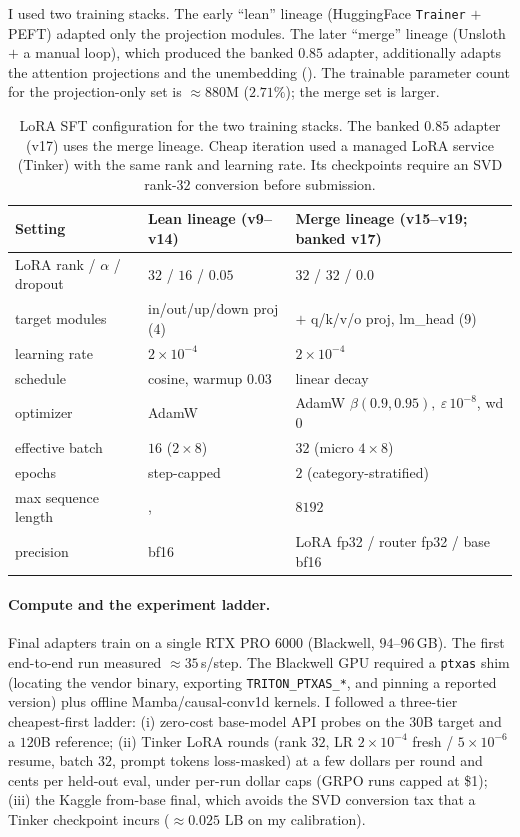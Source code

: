 \documentclass[11pt]{article}
\begin{document}
I used two training stacks. The early ``lean'' lineage (HuggingFace \texttt{Trainer} $+$
PEFT) adapted only the projection modules. The later ``merge'' lineage (Unsloth $+$ a manual
loop), which produced the banked $0.85$ adapter, additionally adapts the attention
projections and the unembedding (). The trainable parameter count for
the projection-only set is $\approx\!880$M ($2.71\%$); the merge set is larger.

\begin{table}[htbp]
\centering
\caption{LoRA SFT configuration for the two training stacks. The banked $0.85$ adapter (v17)
uses the merge lineage. Cheap iteration used a managed LoRA service (Tinker) with the same
rank and learning rate. Its checkpoints require an SVD rank-$32$ conversion before
submission.}
\label{tab:trainconfig}
\small
\begin{tabular}{l l l}
\toprule
Setting & Lean lineage (v9--v14) & Merge lineage (v15--v19; banked v17) \\
\midrule
LoRA rank / $\alpha$ / dropout & $32$ / $16$ / $0.05$ & $32$ / $32$ / $0.0$ \\
target modules & in/out/up/down proj (4) & $+$ q/k/v/o proj, lm\_head (9) \\
learning rate & $2\times10^{-4}$ & $2\times10^{-4}$ \\
schedule & cosine, warmup $0.03$ & linear decay \\
optimizer & AdamW & AdamW $\beta(0.9,0.95),\ \varepsilon\,10^{-8}$, wd $0$ \\
effective batch & $16$ ($2\times8$) & $32$ (micro $4\times8$) \\
epochs & step-capped & $2$ (category-stratified) \\
max sequence length &, & $8192$ \\
precision & bf16 & LoRA fp32 / router fp32 / base bf16 \\
\bottomrule
\end{tabular}
\end{table}

\paragraph{Compute and the experiment ladder.} Final adapters train on a single RTX PRO 6000
(Blackwell, $94$--$96$\,GB). The first end-to-end run measured $\approx\!35$\,s/step. The
Blackwell GPU required a \texttt{ptxas} shim (locating the vendor binary, exporting
\texttt{TRITON\_PTXAS\_*}, and pinning a reported version) plus offline Mamba/causal-conv1d
kernels. I followed a three-tier cheapest-first ladder: (i) zero-cost base-model API probes
on the $30$B target and a $120$B reference; (ii) Tinker LoRA rounds (rank $32$, LR
$2\times10^{-4}$ fresh / $5\times10^{-6}$ resume, batch $32$, prompt tokens loss-masked) at a
few dollars per round and cents per held-out eval, under per-run dollar caps (GRPO runs
capped at \$1); (iii) the Kaggle from-base final, which avoids the SVD conversion tax that a
Tinker checkpoint incurs ($\approx\!0.025$ LB on my calibration).
\end{document}
